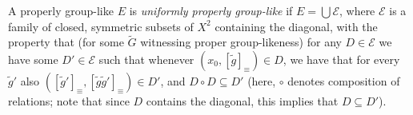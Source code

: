 	\begin{dfn}
		\label{dfn:unif_prop_glike}
		A properly group-like $E$ is \emph{uniformly properly group-like} if $E=\bigcup \mathcal E$, where $\mathcal E$ is a family of closed, symmetric subsets of $X^2$ containing the diagonal, with the property that (for some $\tilde G$ witnessing proper group-likeness) for any $D\in \mathcal E$ we have some $D'\in \mathcal E$ such that whenever $(x_0,[\tilde g]_\equiv)\in D$, we have that for every $\tilde g'$ also $([\tilde g']_\equiv,[\tilde g\tilde g']_\equiv)\in D'$, and $D\circ D\subseteq D'$ (here, $\circ$ denotes composition of relations; note that since $D$ contains the diagonal, this implies that $D\subseteq D'$).\xqed{\lozenge}
	\end{dfn}
	
